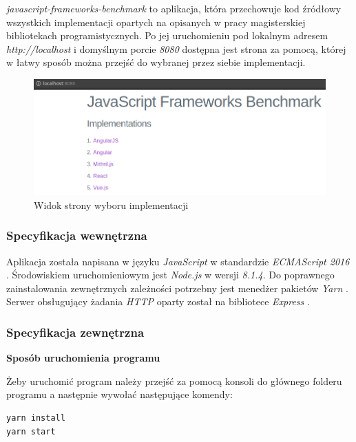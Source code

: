 \documentclass[polish, twoside, 12pt]{mwart}
\begin{document}
\emph{javascript-frameworks-benchmark} to aplikacja, która przechowuje kod źródłowy wszystkich implementacji opartych na opisanych w pracy magisterskiej bibliotekach programistycznych. Po jej uruchomieniu pod lokalnym adresem \emph{http://localhost} i domyślnym porcie \emph{8080} dostępna jest strona za pomocą, której w łatwy sposób można przejść do wybranej przez siebie implementacji.

\begin{figure}[ht]
  \includegraphics[width=\textwidth]{javascript-frameworks-benchmark.png}
	\caption{Widok strony wyboru implementacji}
\end{figure}

\subsubsection{Specyfikacja wewnętrzna}

Aplikacja została napisana w języku \emph{JavaScript} w standardzie \emph{ECMAScript 2016} \cite{es2016}. Środowiskiem uruchomieniowym jest \emph{Node.js} \cite{node.js} w wersji \emph{8.1.4}. Do poprawnego zainstalowania zewnętrznych zależności potrzebny jest menedżer pakietów \emph{Yarn} \cite{yarn}. Serwer obsługujący żadania \emph{HTTP} oparty został na bibliotece \emph{Express} \cite{express}.

\subsubsection{Specyfikacja zewnętrzna}

\textbf{Sposób uruchomienia programu} \newline

Żeby uruchomić program należy przejść za pomocą konsoli do głównego folderu programu a następnie wywołać następujące komendy:

\begin{lstlisting}
yarn install
yarn start
\end{lstlisting}
\end{document}
